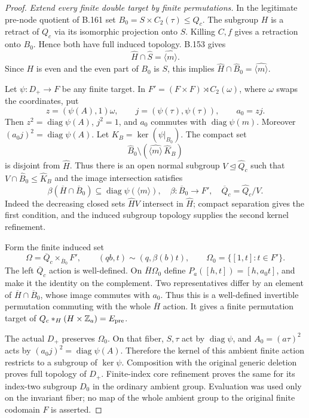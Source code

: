 \begin{proof}
\emph{Extend every finite double target by finite permutations.}
In the legitimate pre-node quotient of B.161 set
$B_0=S\times C_2(\tau)\le Q_c$. The subgroup $H$ is a retract of
$Q_c$ via its isomorphic projection onto $S$. Killing $C,f$ gives a
retraction onto $B_0$. Hence both have full induced topology.
B.153 gives
\[
 \widehat H\cap\widehat S=\widehat{\langle m\rangle}.
\]
Since $H$ is even and the even part of $B_0$ is $S$, this implies
$\widehat H\cap\widehat B_0=\widehat{\langle m\rangle}$.

Let $\psi:D_+\to F$ be any finite target. In
$F'=(F\times F)\rtimes C_2(\omega)$, where $\omega$ swaps the
coordinates, put
\[
 z=(\psi(A),1)\omega,\qquad j=(\psi(\tau),\psi(\tau)),
 \qquad a_0=zj.
\]
Then $z^2=\operatorname{diag}\psi(A)$, $j^2=1$, and $a_0$ commutes
with $\operatorname{diag}\psi(m)$. Moreover
$(a_0j)^2=\operatorname{diag}\psi(A)$.
Let $K_B=\ker(\psi|_{B_0})$. The compact set
\[
 \widehat B_0\setminus
       (\widehat{\langle m\rangle}\,\widehat K_B)
\]
is disjoint from $\widehat H$. Thus there is an open normal subgroup
$V\trianglelefteq\widehat Q_c$ such that $V\cap\widehat B_0\le
\widehat K_B$ and the image intersection satisfies
\[
 \beta(\overline H\cap\overline B_0)
       \subseteq\operatorname{diag}\psi(\langle m\rangle),
 \quad \beta:\overline B_0\to F',\quad
 \overline Q_c=\widehat Q_c/V.
\]
Indeed the decreasing closed sets $\widehat HV$ intersect in
$\widehat H$; compact separation gives the first condition, and
the induced subgroup topology supplies the second kernel refinement.

Form the finite induced set
\[
 \Omega=\overline Q_c\times_{\overline B_0}F',\qquad
 (qb,t)\sim(q,\beta(b)t),\qquad \Omega_0=\{[1,t]:t\in F'\}.
\]
The left $\overline Q_c$ action is well-defined. On
$\overline H\Omega_0$ define $P_a([h,t])=[h,a_0t]$, and make it
the identity on the complement. Two representatives differ by an
element of $\overline H\cap\overline B_0$, whose image commutes with
$a_0$. Thus this is a well-defined invertible permutation commuting
with the whole $\overline H$ action. It gives a finite permutation
target of $Q_c*_{H}(H\times\mathbb Z_a)=E_{\rm pre}$.

The actual $D_+$ preserves $\Omega_0$. On that fiber, $S,\tau$ act
by $\operatorname{diag}\psi$, and $A_0=(a\tau)^2$ acts by
$(a_0j)^2=\operatorname{diag}\psi(A)$. Therefore the kernel of this
ambient finite action restricts to a subgroup of $\ker\psi$.
Composition with the original generic deletion proves full topology
of $D_+$. Finite-index core refinement proves the same for its
index-two subgroup $D_0$ in the ordinary ambient group. Evaluation
was used only on the invariant fiber; no map of the whole ambient
group to the original finite codomain $F$ is asserted.


\end{proof}
